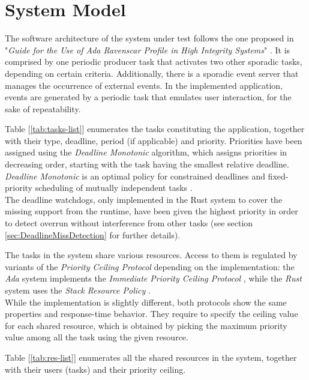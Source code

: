 \section{System Model}
The software architecture of the system under test follows the one proposed in
"\textit{Guide for the Use of Ada Ravenscar Profile in High Integrity Systems}"
\cite{burnsGuideUseAda2004}. It is comprised by one periodic producer task that
activates two other sporadic tasks, depending on certain criteria. Additionally,
there is a sporadic event server that manages the occurrence of external events.
In the implemented application, events are generated by a periodic task that
emulates user interaction, for the sake of repeatability. 

Table [\ref{tab:tasks-list}] enumerates the tasks constituting the
application, together with their type, deadline, period (if applicable) and
priority. Priorities have been assigned using the \textit{Deadline Monotonic}
algorithm, which assigns priorities in decreasing order, starting with the task
having the smallest relative deadline. \textit{Deadline Monotonic} is an optimal
policy for constrained deadlines and fixed-priority scheduling of mutually
independent tasks \cite[p.~119]{liuRealTimeSystems2000}. \\  
The deadline watchdogs, only implemented in the Rust system to cover the missing
support from the runtime, have been given the highest priority in order to
detect overrun without interference from other tasks (see section
\ref{sec:DeadlineMissDetection} for further details).

The tasks in the system share various resources. Access to them is regulated by variants
of the \textit{Priority Ceiling Protocol}
\cite{shaPriorityInheritanceProtocols1990} depending on the implementation: the
\textit{Ada} system implements the \textit{Immediate Priority Ceiling Protocol}
\cite{chengImplementationPriorityCeiling2007}, while the \textit{Rust} system
uses the \textit{Stack Resource Policy}
\cite{bakerStackbasedSchedulingRealtime1991}.\\  
While the implementation is slightly different, both protocols show the same
properties and response-time behavior. They require to specify the ceiling value
for each shared resource, which is obtained by picking the maximum priority
value among all the task using the given resource. 

Table [\ref{tab:res-list}] enumerates all the shared resources in the
system, together with their users (tasks) and their priority ceiling. 

